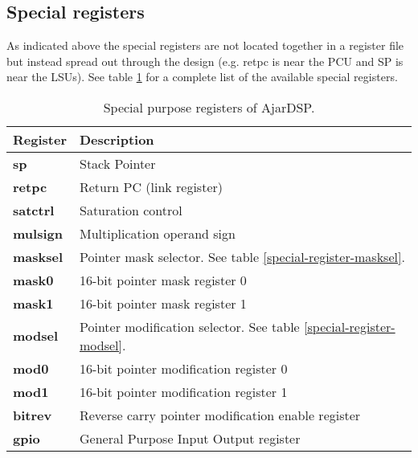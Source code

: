 \documentclass[11pt]{book}
\begin{document}
\subsection{Special registers}
As indicated above the special registers are not located together in a
register file but instead spread out through the design (e.g. retpc is
near the PCU and SP is near the LSUs). See table
\ref{special-registers} for a complete list of the available special
registers. \break
\begin{table}
\begin{center}
  \begin{tabular}{ | l | l |}
    \hline
    \cellcolor{lightgray} Register & \cellcolor{lightgray} Description \\ \hline
    \textbf{sp} & Stack Pointer \\ \hline
    \textbf{retpc} & Return PC (link register) \\ \hline
    \textbf{satctrl} & Saturation control \\ \hline
    \textbf{mulsign} & Multiplication operand sign \\ \hline
    \textbf{masksel} & Pointer mask selector. See table \ref{special-register-masksel}.\\ \hline
    \textbf{mask0}   & 16-bit pointer mask register 0 \\ \hline
    \textbf{mask1}   & 16-bit pointer mask register 1 \\ \hline
    \textbf{modsel}  & Pointer modification selector. See table \ref{special-register-modsel}.\\ \hline
    \textbf{mod0}    & 16-bit pointer modification register 0 \\ \hline
    \textbf{mod1}    & 16-bit pointer modification register 1 \\ \hline
    \textbf{bitrev}  & Reverse carry pointer modification enable register \\ \hline
    \textbf{gpio}    & General Purpose Input Output register \\
    \hline
  \end{tabular}
\end{center}
\caption{Special purpose registers of AjarDSP.}
\label{special-registers}
\end{table}
\end{document}
